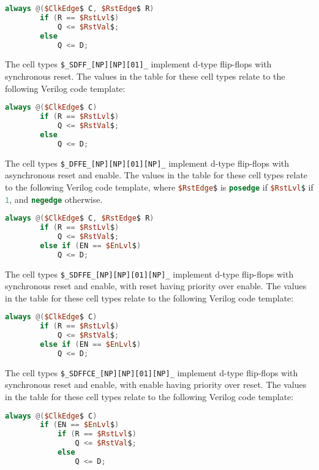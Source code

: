 \begin{lstlisting}[mathescape,language=Verilog]
	always @($ClkEdge$ C, $RstEdge$ R)
		if (R == $RstLvl$)
			Q <= $RstVal$;
		else
			Q <= D;
\end{lstlisting}

The cell types {\tt \$\_SDFF\_[NP][NP][01]\_} implement
d-type flip-flops with synchronous reset. The values in the table for these cell types relate to the
following Verilog code template:

\begin{lstlisting}[mathescape,language=Verilog]
	always @($ClkEdge$ C)
		if (R == $RstLvl$)
			Q <= $RstVal$;
		else
			Q <= D;
\end{lstlisting}

The cell types {\tt \$\_DFFE\_[NP][NP][01][NP]\_} implement
d-type flip-flops with asynchronous reset and enable.  The values in the table for these cell types relate to the
following Verilog code template, where \lstinline[mathescape,language=Verilog];$RstEdge$; is \lstinline[language=Verilog];posedge;
if \lstinline[mathescape,language=Verilog];$RstLvl$; if \lstinline[language=Verilog];1;, and \lstinline[language=Verilog];negedge;
otherwise.

\begin{lstlisting}[mathescape,language=Verilog]
	always @($ClkEdge$ C, $RstEdge$ R)
		if (R == $RstLvl$)
			Q <= $RstVal$;
		else if (EN == $EnLvl$)
			Q <= D;
\end{lstlisting}

The cell types {\tt \$\_SDFFE\_[NP][NP][01][NP]\_} implement d-type flip-flops
with synchronous reset and enable, with reset having priority over enable.
The values in the table for these cell types relate to the
following Verilog code template:

\begin{lstlisting}[mathescape,language=Verilog]
	always @($ClkEdge$ C)
		if (R == $RstLvl$)
			Q <= $RstVal$;
		else if (EN == $EnLvl$)
			Q <= D;
\end{lstlisting}

The cell types {\tt \$\_SDFFCE\_[NP][NP][01][NP]\_} implement d-type flip-flops
with synchronous reset and enable, with enable having priority over reset.
The values in the table for these cell types relate to the
following Verilog code template:

\begin{lstlisting}[mathescape,language=Verilog]
	always @($ClkEdge$ C)
		if (EN == $EnLvl$)
			if (R == $RstLvl$)
				Q <= $RstVal$;
			else
				Q <= D;
\end{lstlisting}

